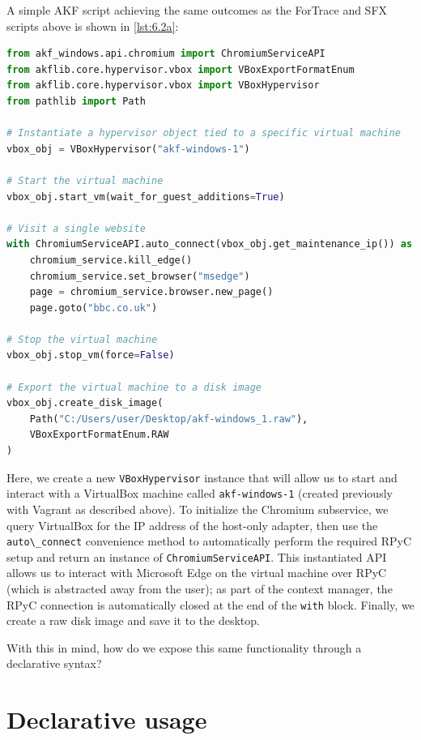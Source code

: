 \documentclass[letterpaper,12pt]{report}
\newcommand{\passthrough}[1]{#1}
\begin{document}
A simple AKF script achieving the same outcomes as the ForTrace and SFX
scripts above is shown in \autoref{lst:6.2a}:

\begin{lstlisting}[label={lst:6.2a}, caption={Example of an imperative AKF scenario}, language=Python]
from akf_windows.api.chromium import ChromiumServiceAPI
from akflib.core.hypervisor.vbox import VBoxExportFormatEnum
from akflib.core.hypervisor.vbox import VBoxHypervisor
from pathlib import Path

# Instantiate a hypervisor object tied to a specific virtual machine
vbox_obj = VBoxHypervisor("akf-windows-1")

# Start the virtual machine
vbox_obj.start_vm(wait_for_guest_additions=True)

# Visit a single website
with ChromiumServiceAPI.auto_connect(vbox_obj.get_maintenance_ip()) as chromium_service:
    chromium_service.kill_edge()
    chromium_service.set_browser("msedge")
    page = chromium_service.browser.new_page()
    page.goto("bbc.co.uk")  

# Stop the virtual machine
vbox_obj.stop_vm(force=False)

# Export the virtual machine to a disk image
vbox_obj.create_disk_image(
    Path("C:/Users/user/Desktop/akf-windows_1.raw"),
    VBoxExportFormatEnum.RAW
)
\end{lstlisting}

Here, we create a new \passthrough{\lstinline!VBoxHypervisor!} instance
that will allow us to start and interact with a VirtualBox machine
called \passthrough{\lstinline!akf-windows-1!} (created previously with
Vagrant as described above). To initialize the Chromium subservice, we
query VirtualBox for the IP address of the host-only adapter, then use
the \passthrough{\lstinline!auto\_connect!} convenience method to
automatically perform the required RPyC setup and return an instance of
\passthrough{\lstinline!ChromiumServiceAPI!}. This instantiated API
allows us to interact with Microsoft Edge on the virtual machine over
RPyC (which is abstracted away from the user); as part of the context
manager, the RPyC connection is automatically closed at the end of the
\passthrough{\lstinline!with!} block. Finally, we create a raw disk
image and save it to the desktop.

With this in mind, how do we expose this same functionality through a
declarative syntax?

\section{Declarative usage}\label{declarative-usage}
\end{document}
